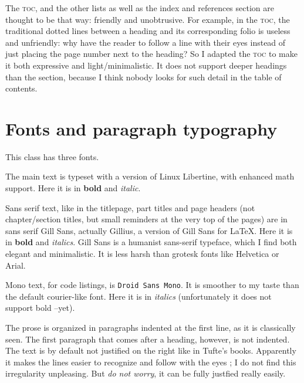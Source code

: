 \documentclass[
    11pt,
]{tufte-style-thesis}
\begin{document}
The \textsc{toc}, and the other lists as well as the index and references section are thought to be that way: friendly and unobtrusive. For example, in the \textsc{toc}, the traditional dotted lines between a heading and its corresponding folio is useless and unfriendly: why have the reader to follow a line with their eyes instead of just placing the page number next to the heading? So I adapted the \textsc{toc} to make it both expressive and light/minimalistic. It does not support deeper headings than the section, because I think nobody looks for such detail in the table of contents.


\section{Fonts and paragraph typography}

This class has three fonts.

The main text is typeset with a version of Linux Libertine, with enhanced math support. Here it is in \textbf{bold} and \textit{italic}.

Sans serif text, like in the titlepage, part titles and page headers (not chapter/section titles, but small reminders at the very top of the pages) are in sans serif {\sffamily Gill Sans}, actually Gillius, a version of Gill Sans for \LaTeX{}. Here it is in {\sffamily\bfseries bold} and {\sffamily\itshape italics}. Gill Sans is a humanist sans-serif typeface, which I find both elegant and minimalistic. It is less harsh than grotesk fonts like Helvetica or Arial.

Mono text, for code listings, is \texttt{Droid Sans Mono}. It is smoother to my taste than the default courier-like font. Here it is in {\ttfamily\itshape italics} (unfortunately it does not support bold --yet).

The prose is organized in paragraphs indented at the first line, as it is classically seen. The first paragraph that comes after a heading, however, is not indented. The text is by default not justified on the right like in Tufte's books. Apparently it makes the lines easier to recognize and follow with the eyes ; I do not find this irregularity unpleasing. But \textit{do not worry}, it can be fully justfied really easily.
\end{document}
